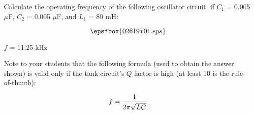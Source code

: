 

Calculate the operating frequency of the following oscillator circuit, if $C_1$ = 0.005 $\mu$F, $C_2$ = 0.005 $\mu$F, and $L_1$ = 80 mH:

$$\epsfbox{02619x01.eps}$$







$f$ = 11.25 kHz







Note to your students that the following formula (used to obtain the answer shown) is valid only if the tank circuit's $Q$ factor is high (at least 10 is the rule-of-thumb):

$$f = {1 \over {2 \pi \sqrt{LC}}}$$




